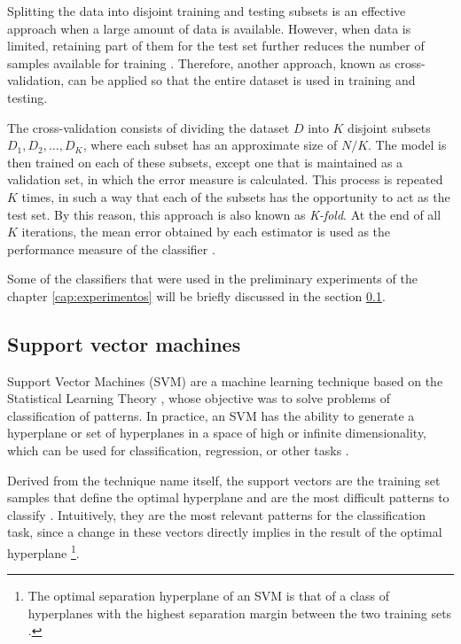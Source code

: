 Splitting the data into disjoint training and testing subsets is an effective approach when a large amount of data is available. However, when data is limited, retaining part of them for the test set further reduces the number of samples available for training \citep{mitchell:97}. Therefore, another approach, known as cross-validation, can be applied so that the entire dataset is used in training and testing.

The cross-validation consists of dividing the dataset $D$ into $K$ disjoint subsets $D_1, D_2, \ldots, D_K$, where each subset has an approximate size of $N / K$. The model is then trained on each of these subsets, except one that is maintained as a validation set, in which the error measure is calculated. This process is repeated $K$ times, in such a way that each of the subsets has the opportunity to act as the test set. By this reason, this approach is also known as \emph{K-fold}. At the end of all $K$ iterations, the mean error obtained by each estimator is used as the performance measure of the classifier \citep{mostafa:12}.

Some of the classifiers that were used in the preliminary experiments of the chapter \ref{cap:experimentos} will be briefly discussed in the section \ref{sec:classifiers_svm}.



\subsection{Support vector machines}
\label{sec:classifiers_svm}
Support Vector Machines (SVM) are a machine learning technique based on the Statistical Learning Theory \citep{vapnik:13}, whose objective was to solve problems of classification of patterns. In practice, an SVM has the ability to generate a hyperplane or set of hyperplanes in a space of high or infinite dimensionality, which can be used for classification, regression, or other tasks \citep{duda:12}.

Derived from the technique name itself, the support vectors are the training set samples that define the optimal hyperplane and are the most difficult patterns to classify \citep{duda:12}. Intuitively, they are the most relevant patterns for the classification task, since a change in these vectors directly implies in the result of the optimal hyperplane \footnote{The optimal separation hyperplane of an SVM is that of a class of hyperplanes with the highest separation margin between the two training sets \citep{cortes:95}.}.

